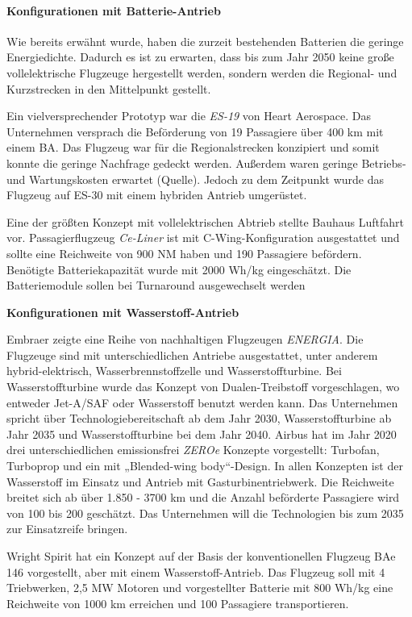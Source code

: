 \paragraph{Konfigurationen mit Batterie-Antrieb}
Wie bereits erwähnt wurde, haben die zurzeit bestehenden Batterien die geringe Energiedichte. Dadurch es ist zu erwarten, dass bis zum Jahr 
2050 keine große vollelektrische Flugzeuge hergestellt werden, sondern werden die Regional- und Kurzstrecken in den Mittelpunkt gestellt.

Ein vielversprechender Prototyp war die \textit{ES-19} von Heart Aerospace. Das Unternehmen versprach die Beförderung von 19 Passagiere über 400 km mit einem BA. 
Das Flugzeug war für die Regionalstrecken konzipiert und somit konnte die geringe Nachfrage gedeckt werden. 
Außerdem waren geringe Betriebs- und Wartungskosten erwartet (Quelle).
Jedoch zu dem Zeitpunkt wurde das Flugzeug auf ES-30 mit einem hybriden Antrieb umgerüstet.

Eine der größten Konzept mit vollelektrischen Abtrieb stellte Bauhaus Luftfahrt vor. Passagierflugzeug \textit{Ce-Liner} \cite{BauhausLuftfahrt} ist mit C-Wing-Konfiguration
ausgestattet und sollte eine Reichweite von 900 NM haben und 190 Passagiere befördern. Benötigte Batteriekapazität 
wurde mit 2000 Wh/kg eingeschätzt. Die Batteriemodule sollen bei Turnaround ausgewechselt werden


\textbf{Konfigurationen mit Wasserstoff-Antrieb}

Embraer zeigte eine Reihe von nachhaltigen Flugzeugen \textit{ENERGIA}. Die Flugzeuge sind mit unterschiedlichen Antriebe ausgestattet, unter anderem 
hybrid-elektrisch, Wasserbrennstoffzelle und Wasserstoffturbine. Bei Wasserstoffturbine wurde das Konzept von Dualen-Treibstoff vorgeschlagen, 
wo entweder Jet-A/SAF oder Wasserstoff benutzt werden kann. Das Unternehmen spricht über Technologiebereitschaft ab dem Jahr 2030, Wasserstoffturbine
ab Jahr 2035 und Wasserstoffturbine bei dem Jahr 2040. \cite{embraer_energia_2021}
%
Airbus \cite{airbus_zea_concepts} hat im Jahr 2020 drei unterschiedlichen emissionsfrei \textit{ZEROe} Konzepte vorgestellt: Turbofan, Turboprop 
und ein mit „Blended-wing body“-Design.
In allen Konzepten ist der Wasserstoff im Einsatz und Antrieb mit Gasturbinentriebwerk. Die Reichweite breitet sich ab über 1.850 - 
3700 km und die Anzahl beförderte Passagiere wird von 100 bis 200 geschätzt. Das Unternehmen will die Technologien bis zum 2035 zur Einsatzreife bringen.

Wright Spirit \cite{wright_electric_website} hat ein Konzept auf der Basis der konventionellen Flugzeug BAe 146 vorgestellt, aber mit einem Wasserstoff-Antrieb.
Das Flugzeug soll mit 4 Triebwerken, 2,5 MW Motoren und vorgestellter Batterie mit 800 Wh/kg eine Reichweite von 1000 
km erreichen und 100 Passagiere transportieren.

